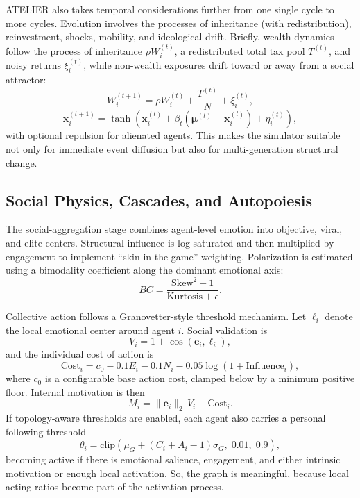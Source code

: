 \documentclass[12pt]{IEEEtran}
\begin{document}
ATELIER also takes temporal considerations further from one single cycle to more cycles. Evolution involves the processes of inheritance (with redistribution), reinvestment, shocks, mobility, and ideological drift. Briefly, wealth dynamics follow the process of inheritance $\rho W_i^{(t)}$, a redistributed total tax pool $T^{(t)}$, and noisy returns $\xi_i^{(t)}$, while non-wealth exposures drift toward or away from a social attractor:
\begin{equation}
W_i^{(t+1)} = \rho W_i^{(t)} + \frac{T^{(t)}}{N} + \xi_i^{(t)},
\end{equation}
\begin{equation}
\mathbf{x}_i^{(t+1)} = \tanh\!\left(\mathbf{x}_i^{(t)} + \beta_t(\boldsymbol{\mu}^{(t)}-\mathbf{x}_i^{(t)}) + \eta_i^{(t)}\right),
\end{equation}
with optional repulsion for alienated agents. This makes the simulator suitable not only for immediate event diffusion but also for multi-generation structural change.

\subsection{Social Physics, Cascades, and Autopoiesis}

The social-aggregation stage combines agent-level emotion into objective, viral, and elite centers. Structural influence is log-saturated and then multiplied by engagement to implement ``skin in the game'' weighting. Polarization is estimated using a bimodality coefficient along the dominant emotional axis:
\begin{equation}
BC = \frac{\text{Skew}^2 + 1}{\text{Kurtosis} + \epsilon}.
\end{equation}

Collective action follows a Granovetter-style threshold mechanism. Let $\ell_i$ denote the local emotional center around agent $i$. Social validation is
\begin{equation}
V_i = 1 + \cos(\mathbf{e}_i,\ell_i),
\end{equation}
and the individual cost of action is
\begin{equation}
\text{Cost}_i = c_0 - 0.1E_i - 0.1N_i - 0.05\log(1+\text{Influence}_i),
\end{equation}
where $c_0$ is a configurable base action cost, clamped below by a minimum positive floor. Internal motivation is then
\begin{equation}
M_i = \|\mathbf{e}_i\|_2 \, V_i - \text{Cost}_i.
\end{equation}
If topology-aware thresholds are enabled, each agent also carries a personal following threshold
\begin{equation}
\theta_i = \text{clip}\!\left(\mu_G + (C_i + A_i - 1)\sigma_G,\; 0.01,\; 0.9\right),
\end{equation}
becoming active if there is emotional salience, engagement, and either intrinsic motivation or enough local activation. So, the graph is meaningful, because local acting ratios become part of the activation process.
\end{document}
